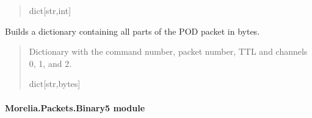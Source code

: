 \documentclass[letterpaper,10pt,english]{sphinxmanual}
\begin{document}
\begin{fulllineitems}
\begin{fulllineitems}
\begin{quote}
\begin{description}
\sphinxAtStartPar
dict{[}str,int{]}

\end{description}\end{quote}

\end{fulllineitems}


\begin{fulllineitems}
\label{\detokenize{Morelia.Packets:Morelia.Packets.Binary4.PacketBinary4.UnpackAll}}
\pysigstartsignatures
{}
\pysigstopsignatures
\sphinxAtStartPar
Builds a dictionary containing all parts of the POD packet in bytes.
\begin{quote}\begin{description}
\sphinxAtStartPar
Dictionary with the command number, packet number, TTL                 and channels 0, 1, and 2.

\sphinxAtStartPar
dict{[}str,bytes{]}

\end{description}\end{quote}

\end{fulllineitems}


\end{fulllineitems}



\paragraph{Morelia.Packets.Binary5 module}
\label{\detokenize{Morelia.Packets:module-Morelia.Packets.Binary5}}\label{\detokenize{Morelia.Packets:morelia-packets-binary5-module}}
\end{document}
